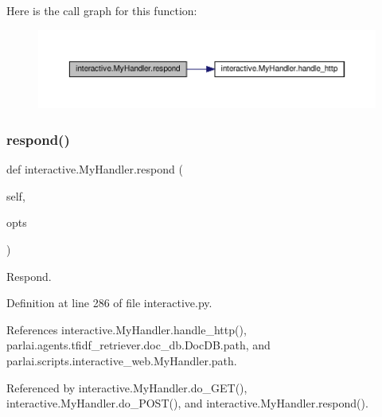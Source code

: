 Here is the call graph for this function\+:
\nopagebreak
\begin{figure}[H]
\begin{center}
\leavevmode
\includegraphics[width=350pt]{classinteractive_1_1MyHandler_a90d22dc71dcfeeedcb3c6d4ce61cccf1_cgraph}
\end{center}
\end{figure}
\mbox{\label{classinteractive_1_1MyHandler_a90d22dc71dcfeeedcb3c6d4ce61cccf1}} 
\subsubsection{\texorpdfstring{respond()}{respond()}\hspace{0.1cm}{\footnotesize\ttfamily [2/2]}}
{\footnotesize\ttfamily def interactive.\+My\+Handler.\+respond (\begin{DoxyParamCaption}\item[{}]{self,  }\item[{}]{opts }\end{DoxyParamCaption})}

\begin{DoxyVerb}Respond.\end{DoxyVerb}
 

Definition at line 286 of file interactive.\+py.



References interactive.\+My\+Handler.\+handle\+\_\+http(), parlai.\+agents.\+tfidf\+\_\+retriever.\+doc\+\_\+db.\+Doc\+D\+B.\+path, and parlai.\+scripts.\+interactive\+\_\+web.\+My\+Handler.\+path.



Referenced by interactive.\+My\+Handler.\+do\+\_\+\+G\+E\+T(), interactive.\+My\+Handler.\+do\+\_\+\+P\+O\+S\+T(), and interactive.\+My\+Handler.\+respond().

